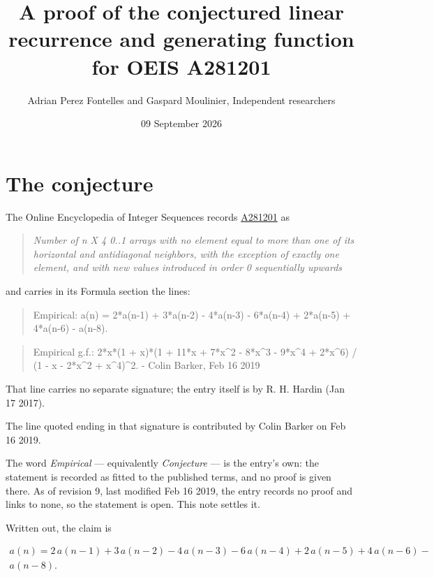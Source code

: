 \documentclass[11pt]{article}
\title{A proof of the conjectured linear recurrence and generating function for OEIS A281201}
\author{Adrian Perez Fontelles and Gaspard Moulinier, Independent researchers}
\date{09 September 2026}
\theoremstyle{definition}
\begin{document}
\maketitle
\section{The conjecture}

The Online Encyclopedia of Integer Sequences records \href{https://oeis.org/A281201}{A281201} as

\begin{quote}\itshape Number of n X 4 0..1 arrays with no element equal to more than one of its horizontal and antidiagonal neighbors, with the exception of exactly one element, and with new values introduced in order 0 sequentially upwards\end{quote}

and carries in its Formula section the lines:

\begin{quote}\ttfamily Empirical: a(n) = 2*a(n-1) + 3*a(n-2) - 4*a(n-3) - 6*a(n-4) + 2*a(n-5) + 4*a(n-6) - a(n-8).\end{quote}

\begin{quote}\ttfamily Empirical g.f.: 2*x*(1 + x)*(1 + 11*x + 7*x\textasciicircum{}2 - 8*x\textasciicircum{}3 - 9*x\textasciicircum{}4 + 2*x\textasciicircum{}6) / (1 - x - 2*x\textasciicircum{}2 + x\textasciicircum{}4)\textasciicircum{}2. - Colin Barker, Feb 16 2019\end{quote}

That line carries no separate signature; the entry itself is by R. H. Hardin (Jan 17 2017).

The line quoted ending in that signature is contributed by Colin Barker on Feb 16 2019.

The word {\itshape Empirical} --- equivalently {\itshape Conjecture} --- is the entry's own: the statement is recorded as fitted to the published terms, and no proof is given there. As of revision 9, last modified Feb 16 2019, the entry records no proof and links to none, so the statement is open. This note settles it.

Written out, the claim is

\begin{multline*} a(n) = 2\,a(n-1) + 3\,a(n-2) - 4\,a(n-3) - 6\,a(n-4) + 2\,a(n-5) + 4\,a(n-6) - \\ a(n-8). \end{multline*}
\end{document}
